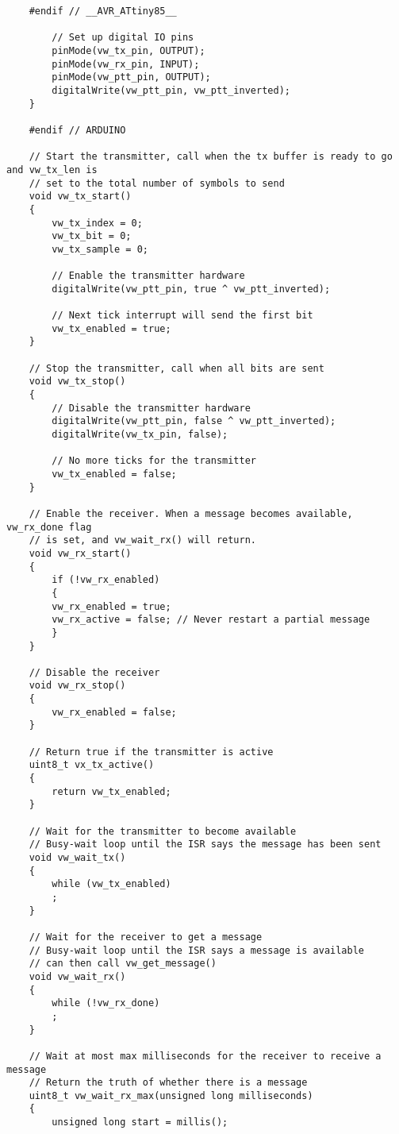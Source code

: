 \begin{verbatim}
    #endif // __AVR_ATtiny85__

        // Set up digital IO pins
        pinMode(vw_tx_pin, OUTPUT);
        pinMode(vw_rx_pin, INPUT);
        pinMode(vw_ptt_pin, OUTPUT);
        digitalWrite(vw_ptt_pin, vw_ptt_inverted);
    }

    #endif // ARDUINO

    // Start the transmitter, call when the tx buffer is ready to go and vw_tx_len is
    // set to the total number of symbols to send
    void vw_tx_start()
    {
        vw_tx_index = 0;
        vw_tx_bit = 0;
        vw_tx_sample = 0;

        // Enable the transmitter hardware
        digitalWrite(vw_ptt_pin, true ^ vw_ptt_inverted);

        // Next tick interrupt will send the first bit
        vw_tx_enabled = true;
    }

    // Stop the transmitter, call when all bits are sent
    void vw_tx_stop()
    {
        // Disable the transmitter hardware
        digitalWrite(vw_ptt_pin, false ^ vw_ptt_inverted);
        digitalWrite(vw_tx_pin, false);

        // No more ticks for the transmitter
        vw_tx_enabled = false;
    }

    // Enable the receiver. When a message becomes available, vw_rx_done flag
    // is set, and vw_wait_rx() will return.
    void vw_rx_start()
    {
        if (!vw_rx_enabled)
        {
        vw_rx_enabled = true;
        vw_rx_active = false; // Never restart a partial message
        }
    }

    // Disable the receiver
    void vw_rx_stop()
    {
        vw_rx_enabled = false;
    }

    // Return true if the transmitter is active
    uint8_t vx_tx_active()
    {
        return vw_tx_enabled;
    }

    // Wait for the transmitter to become available
    // Busy-wait loop until the ISR says the message has been sent
    void vw_wait_tx()
    {
        while (vw_tx_enabled)
        ;
    }

    // Wait for the receiver to get a message
    // Busy-wait loop until the ISR says a message is available
    // can then call vw_get_message()
    void vw_wait_rx()
    {
        while (!vw_rx_done)
        ;
    }

    // Wait at most max milliseconds for the receiver to receive a message
    // Return the truth of whether there is a message
    uint8_t vw_wait_rx_max(unsigned long milliseconds)
    {
        unsigned long start = millis();


\end{verbatim}
